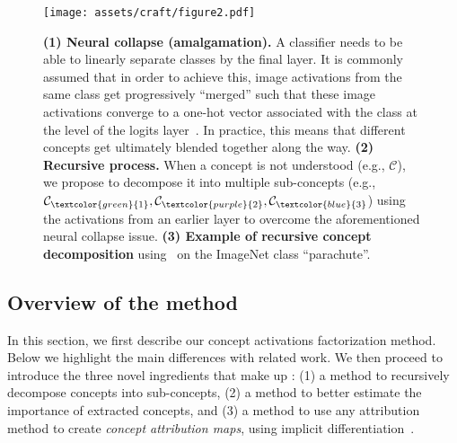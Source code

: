 \begin{figure*}[t!]
\centering\texttt{[image: assets/craft/figure2.pdf]}
\caption{ 
\textbf{(1) Neural collapse (amalgamation).}
A classifier needs to be able to linearly separate classes by the final layer. It is commonly assumed that in order to achieve this, image activations from the same class get progressively ``merged'' such that these image activations converge to a one-hot vector associated with the class at the level of the logits layer~\cite{paypan2020collapse}. 
In practice, this means that different concepts get ultimately blended together along the way. 
\textbf{(2) Recursive process.} When a concept is not understood (e.g., $\mathcal{C}$), we propose to decompose it into multiple sub-concepts (e.g., $\mathcal{C}_{\textcolor{green}{1}}, \mathcal{C}_{\textcolor{purple}{2}}, \mathcal{C}_{\textcolor{blue}{3}}$) using the activations from an earlier layer to overcome the aforementioned neural collapse issue.
\textbf{(3) Example of recursive concept decomposition} using \craft~on the ImageNet class ``parachute''.
}
\label{fig:craft:collapse}
\end{figure*}


\subsection{Overview of the method} \label{sec:craft:method}

In this section, we first describe our concept activations factorization method. Below we highlight the main differences with related work.
We then proceed to introduce the three novel ingredients that make up \craft: %
(1) a method to recursively decompose concepts into sub-concepts, 
(2) a method to better estimate the importance of extracted concepts, and 
(3) a method to use any attribution method to create \textit{concept attribution maps}, using implicit differentiation~\cite{krantz2002implicit,griewank2008evaluating,blondel2021implicitdiff}.%



